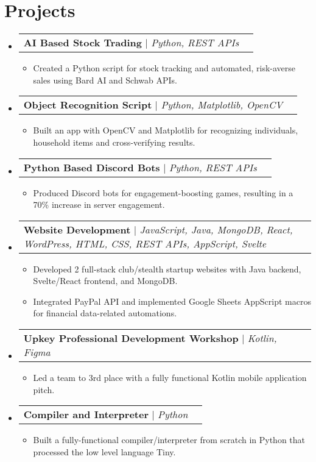 \documentclass[letterpaper,11pt]{article}
\makeatletter
\newcommand{\resumeItem}[1]{
  \item\small{
    {#1 \vspace{-2pt}}
  }
}
\newcommand{\resumeProjectHeading}[2]{
    \item
    \begin{tabular*}{0.97\textwidth}{l@{\extracolsep{\fill}}r}
      \small#1 & #2 \\
    \end{tabular*}\vspace{-7pt}
}
\newcommand{\resumeSubHeadingListStart}{\begin{itemize}[leftmargin=0.15in, label={}]}
\newcommand{\resumeSubHeadingListEnd}{\end{itemize}}
\newcommand{\resumeItemListStart}{\begin{itemize}}
\newcommand{\resumeItemListEnd}{\end{itemize}\vspace{-5pt}}
\makeatother
\begin{document}
\section{Projects}
\resumeSubHeadingListStart
\resumeProjectHeading
    {\textbf{AI Based Stock Trading} $|$ \emph{Python, REST APIs}}{}
      \resumeItemListStart
        \resumeItem{Created a Python script for stock tracking and automated, risk-averse sales using Bard AI and Schwab APIs.}
      \resumeItemListEnd
\resumeProjectHeading
    {\textbf{Object Recognition Script} $|$ \emph{Python, Matplotlib, OpenCV}}{}
      \resumeItemListStart
        \resumeItem{Built an app with OpenCV and Matplotlib for recognizing individuals, household items and cross-verifying results.}
      \resumeItemListEnd
\resumeProjectHeading
    {\textbf{Python Based Discord Bots} $|$ \emph{Python, REST APIs}}{}
      \resumeItemListStart
        \resumeItem{Produced Discord bots for engagement-boosting games, resulting in a 70\% increase in server engagement.}
      \resumeItemListEnd
\resumeProjectHeading
    {\textbf{Website Development} $|$ \emph{JavaScript, Java, MongoDB, React, WordPress, HTML, CSS, REST APIs, AppScript, Svelte}}{}
    \resumeItemListStart
      \resumeItem{Developed 2 full-stack club/stealth startup websites with Java backend, Svelte/React frontend, and MongoDB.}
      \resumeItem{Integrated PayPal API and implemented Google Sheets AppScript macros for financial data-related automations.}
    \resumeItemListEnd
\resumeProjectHeading
    {\textbf{Upkey Professional Development Workshop} $|$ \emph{Kotlin, Figma}}{}
    \resumeItemListStart
      \resumeItem{Led a team to 3rd place with a fully functional Kotlin mobile application pitch.}
    \resumeItemListEnd
\resumeProjectHeading
    {\textbf{Compiler and Interpreter} $|$ \emph{Python}}{}
    \resumeItemListStart
      \resumeItem{Built a fully-functional compiler/interpreter from scratch in Python that processed the low level language Tiny.}
    \resumeItemListEnd

\resumeSubHeadingListEnd


\end{document}
